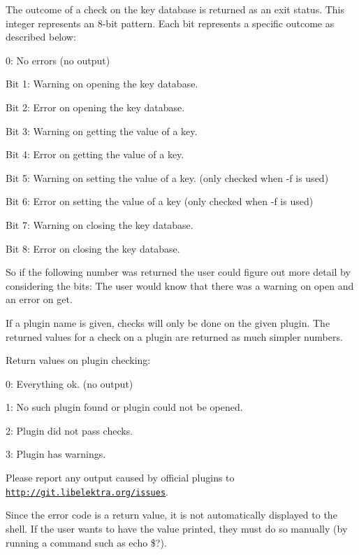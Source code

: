 The outcome of a check on the key database is returned as an exit status. This integer represents an 8-\/bit pattern. Each bit represents a specific outcome as described below\+:


\begin{DoxyItemize}
\item 0\+: No errors (no output)
\item Bit 1\+: Warning on opening the key database.
\item Bit 2\+: Error on opening the key database.
\item Bit 3\+: Warning on getting the value of a key.
\item Bit 4\+: Error on getting the value of a key.
\item Bit 5\+: Warning on setting the value of a key. (only checked when {\ttfamily -\/f} is used)
\item Bit 6\+: Error on setting the value of a key (only checked when {\ttfamily -\/f} is used)
\item Bit 7\+: Warning on closing the key database.
\item Bit 8\+: Error on closing the key database.
\end{DoxyItemize}

So if the following number was returned {} the user could figure out more detail by considering the bits\+: {} The user would know that there was a warning on open and an error on get.

If a plugin name is given, checks will only be done on the given plugin. The returned values for a check on a plugin are returned as much simpler numbers.

Return values on plugin checking\+:


\begin{DoxyItemize}
\item 0\+: Everything ok. (no output)
\item 1\+: No such plugin found or plugin could not be opened.
\item 2\+: Plugin did not pass checks.
\item 3\+: Plugin has warnings.
\end{DoxyItemize}

Please report any output caused by official plugins to \href{http://git.libelektra.org/issues}{\tt http\+://git.\+libelektra.\+org/issues}.

Since the error code is a return value, it is not automatically displayed to the shell. If the user wants to have the value printed, they must do so manually (by running a command such as {\ttfamily echo \$?}).

